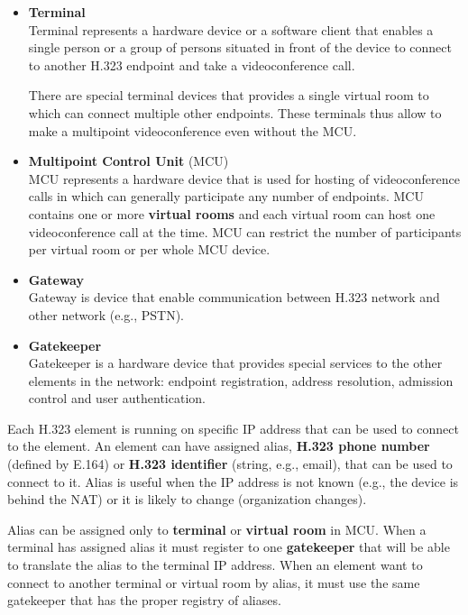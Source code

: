 \documentclass[a4paper]{report}
\begin{document}
\begin{itemize}

\item \textbf{Terminal} \\
Terminal represents a hardware device or a software client that enables a single person or a group of persons situated in front of the device to connect to another H.323 endpoint and take a videoconference call.

There are special terminal devices that provides a single virtual room to which can connect multiple other endpoints.  These terminals thus allow to make a multipoint videoconference even without the MCU.

\item \textbf{Multipoint Control Unit} (MCU) \\
MCU represents a hardware device that is used for hosting of videoconference calls in which can generally participate any number of endpoints. MCU contains one or more \textbf{virtual rooms} and each virtual room can host one videoconference call at the time. MCU can restrict the number of participants per virtual room or per whole MCU device.

\item \textbf{Gateway} \\
Gateway is device that enable communication between H.323 network and other network (e.g., PSTN).

\item \textbf{Gatekeeper} \\
Gatekeeper is a hardware device that provides special services to the other elements in the network: endpoint registration, address resolution, admission control and user authentication.

\end{itemize}

Each H.323 element is running on specific IP address that can be used to connect to the element. An element can have assigned alias, \textbf{H.323 phone number} (defined by E.164) or \textbf{H.323 identifier} (string, e.g., email), that can be used to connect to it. Alias is useful when the IP address is not known (e.g., the device is behind the NAT) or it is likely to change (organization changes).

Alias can be assigned only to \textbf{terminal} or \textbf{virtual room} in MCU. When a terminal has assigned alias it must register to one \textbf{gatekeeper} that will be able to translate the alias to the terminal IP address. When an element want to connect to another terminal or virtual room by alias, it must use the same gatekeeper that has the proper registry of aliases.
\end{document}
